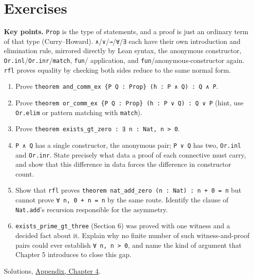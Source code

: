 \section{Exercises}\label{sec:04-propositions-and-proofs:08-exercises:1}

\textbf{Key points.} \texttt{Prop} is the type of statements, and a proof is just an ordinary term of that type (Curry--Howard). \texttt{∧}/\texttt{∨}/\texttt{→}/\texttt{∀}/\texttt{∃} each have their own introduction and elimination rule, mirrored directly by Lean syntax, the anonymous constructor, \texttt{Or.inl}/\texttt{Or.inr}/\texttt{match}, \texttt{fun}/ application, and \texttt{fun}/anonymous-constructor again. \texttt{rfl} proves equality by checking both sides reduce to the same normal form.

\begin{enumerate}
\def\labelenumi{\arabic{enumi}.}
\tightlist
\item
  Prove \texttt{theorem and\_\allowbreak{}comm\_\allowbreak{}ex \{P Q : Prop\} (h : P ∧ Q) : Q ∧ P}.
\item
  Prove \texttt{theorem or\_\allowbreak{}comm\_\allowbreak{}ex \{P Q : Prop\} (h : P ∨ Q) : Q ∨ P} (hint, use \texttt{Or.elim} or pattern matching with \texttt{match}).
\item
  Prove \texttt{theorem exists\_\allowbreak{}gt\_\allowbreak{}zero : ∃ n : Nat, n > 0}.
\item
  \texttt{P ∧ Q} has a single constructor, the anonymous pair; \texttt{P ∨ Q} has two, \texttt{Or.inl} and \texttt{Or.inr}. State precisely what data a proof of each connective must carry, and show that this difference in data forces the difference in constructor count.
\item
  Show that \texttt{rfl} proves \texttt{theorem nat\_\allowbreak{}add\_\allowbreak{}zero (n : Nat) : n + 0 = n} but cannot prove \texttt{∀ n, 0 + n = n} by the same route. Identify the clause of \texttt{Nat.add}'s recursion responsible for the asymmetry.
\item
  \texttt{exists\_\allowbreak{}prime\_\allowbreak{}gt\_\allowbreak{}three} (Section 6) was proved with one witness and a decided fact about it. Explain why no finite number of such witness-and-proof pairs could ever establish \texttt{∀ n, n > 0}, and name the kind of argument that Chapter 5 introduces to close this gap.
\end{enumerate}

Solutions, \hyperref[sec:15-appendix-solutions:04-chapter-4:1]{Appendix, Chapter 4}.

